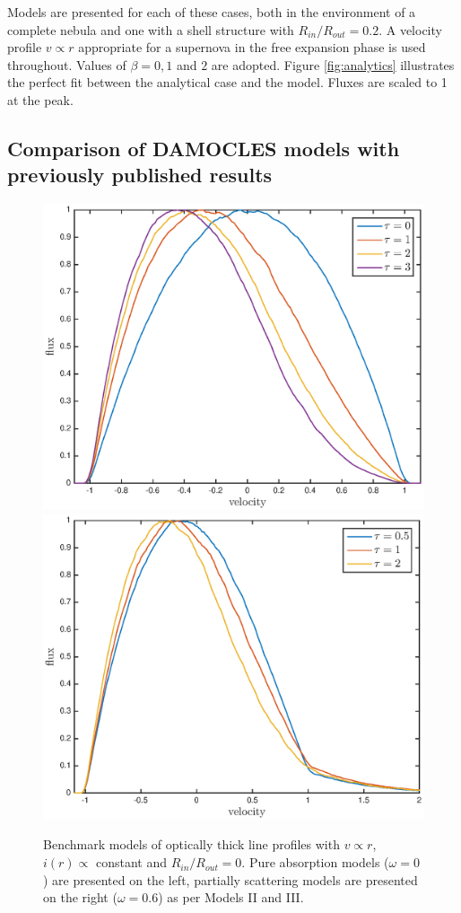 \documentclass[useAMS,usenatbib,usegraphicx]{mnras}
\begin{document}
Models are presented for each of these cases, both in the environment of a 
complete nebula and one with a shell structure with $R_{in}/R_{out}=0.2$.  
A velocity profile $v \propto r$ appropriate for a supernova in the free 
expansion phase is used throughout.  Values of $\beta = 0, 1$ and $2$ are 
adopted.  Figure \ref{fig:analytics} illustrates the perfect fit between 
the analytical case and the model.  Fluxes are scaled to 1 at the peak.

\subsection{Comparison of DAMOCLES models with previously published results}
\label{opt_thick_testing}
\begin{figure}
\includegraphics[trim =37 10 45 15,clip=true,scale=0.51]{params/opt_thick_w0} 
\includegraphics[trim =37 10 45 15,clip=true,scale=0.51]{params/opt_thick_w0_6}  
\caption{Benchmark models of optically thick line profiles  with $v \propto r$, $i(r) \propto$ constant and $R_{in}/R_{out}=0$.  Pure absorption models ($\omega = 0$) are presented on the left, partially scattering models are presented on the right ($\omega = 0.6$) as per \citet{Lucy1989a} Models II and III.}
\label{fig:Lucy}
\end{figure}
\end{document}
